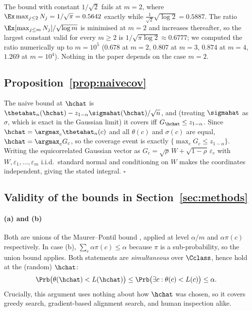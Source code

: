 \begin{remark}
The bound with constant $1/\sqrt2$ fails at $m=2$, where
$\Ex\max_{j\le 2}N_j = 1/\sqrt\pi = 0.5642$ exactly while
$\tfrac1{\sqrt2}\sqrt{\log 2}=0.5887$. The ratio
$\Ex[\max_{j\le m}N_j]/\sqrt{\log m}$ is minimised at $m=2$ and increases
thereafter, so the largest constant valid for every $m\ge2$ is
$1/\sqrt{\pi\log 2}\approx0.6777$; we computed the ratio numerically up to
$m=10^5$ ($0.678$ at $m=2$, $0.807$ at $m=3$, $0.874$ at $m=4$, $1.269$ at
$m=10^4$). Nothing in the paper depends on the case $m=2$.
\end{remark}

\subsection{Proposition~\ref{prop:naivecov}}

The naive bound at $\hchat$ is
$\thetahat_n(\hchat)-z_{1-\alpha}\sigmahat(\hchat)/\sqrt n$, and (treating
$\sigmahat$ as $\sigma$, which is exact in the Gaussian limit) it covers iff
$G_{\hchat}\le z_{1-\alpha}$. Since $\hchat=\argmax_c\thetahat_n(c)$ and all
$\theta(c)$ and $\sigma(c)$ are equal, $\hchat=\argmax_c G_c$, so the coverage
event is exactly $\{\max_c G_c\le z_{1-\alpha}\}$. Writing the equicorrelated
Gaussian vector as $G_c=\sqrt\rho\,W+\sqrt{1-\rho}\,\varepsilon_c$ with
$W,\varepsilon_1,\dots,\varepsilon_m$ i.i.d.\ standard normal and conditioning on
$W$ makes the coordinates independent, giving the stated integral.
\hfill$\square$

\subsection{Validity of the bounds in Section~\ref{sec:methods}}

\paragraph{(a) and (b)} Both are unions of the Maurer--Pontil bound
\citep[Thm.~4]{maurer2009empirical}, applied at level $\alpha/m$ and
$\alpha\pi(c)$ respectively. In case (b), $\sum_c \alpha\pi(c)\le\alpha$ because
$\pi$ is a sub-probability, so the union bound applies. Both statements are
\emph{simultaneous} over $\Cclass$, hence hold at the (random) $\hchat$:
\[
\Prb\big(\theta(\hchat)<L(\hchat)\big)\le\Prb\big(\exists c:\theta(c)<L(c)\big)\le\alpha .
\]
Crucially, this argument uses nothing about how $\hchat$ was chosen, so it covers
greedy search, gradient-based alignment search, and human inspection alike.

